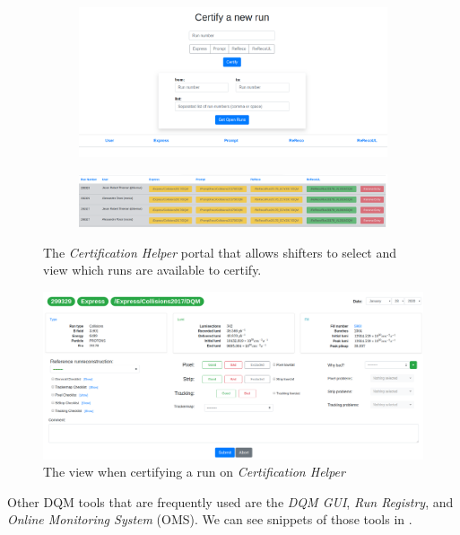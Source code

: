 \begin{figure}
	\centering

	\begin{subfigure}{.7\linewidth}
		\includegraphics*[width=\linewidth,trim= 4in 1.5in 4in 0]{Images/certhelper-portal.png}
	\end{subfigure}

	\begin{subfigure}{\linewidth}
		\includegraphics[width=1\linewidth]{Images/certhelper-list.png}
	\end{subfigure}
	\caption{The \textit{Certification Helper} portal that allows shifters to select and view which runs are available to certify.}
	\label{fig:certhelper-portal}
\end{figure}
\begin{figure}
	\centering
	\includegraphics[width=1\linewidth]{Images/certhelp-cert.png}
	\caption{The view when certifying a run on \textit{Certification Helper}}
	\label{fig:certhelper-cert}
\end{figure}


Other DQM tools that are frequently used are the \textit{DQM GUI}, \textit{Run Registry}, and \textit{Online Monitoring System} (OMS). We can see snippets of those tools in .


